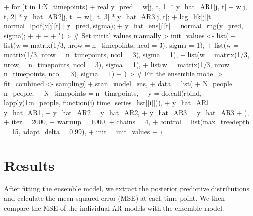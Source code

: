 \documentclass{article}
\begin{document}
\begin{Schunk}
\begin{Sinput}
{{+     for (t in 1:N_timepoints) {
+       real y_pred = w[j, t, 1] * y_hat_AR1[j, t] + w[j, t, 2] * y_hat_AR2[j, t] + w[j, t, 3] * y_hat_AR3[j, t];
+       log_lik[j][t] = normal_lpdf(y[j][t] | y_pred, sigma);
+       y_hat_ens[j][t] = normal_rng(y_pred, sigma);
+     }
+   }
+ }
+ ")
> # Set initial values manually
> init_values <- list(
+   list(w = matrix(1/3, nrow = n_timepoints, ncol = 3), sigma = 1),
+   list(w = matrix(1/3, nrow = n_timepoints, ncol = 3), sigma = 1),
+   list(w = matrix(1/3, nrow = n_timepoints, ncol = 3), sigma = 1),
+   list(w = matrix(1/3, nrow = n_timepoints, ncol = 3), sigma = 1)
+ )
> # Fit the ensemble model
> fit_combined <- sampling(
+   stan_model_ens, 
+   data = list(
+     N_people = n_people,
+     N_timepoints = n_timepoints,
+     y = do.call(rbind, lapply(1:n_people, function(i) time_series_list[[i]])),
+     y_hat_AR1 = y_hat_AR1,
+     y_hat_AR2 = y_hat_AR2,
+     y_hat_AR3 = y_hat_AR3
+   ),
+   iter = 2000, 
+   warmup = 1000, 
+   chains = 4, 
+   control = list(max_treedepth = 15, adapt_delta = 0.99),
+   init = init_values
+ )
\end{Sinput}
\end{Schunk}

\section{Results}

After fitting the ensemble model, we extract the posterior predictive distributions and calculate the mean squared error (MSE) at each time point. We then compare the MSE of the individual AR models with the ensemble model.
\end{document}
